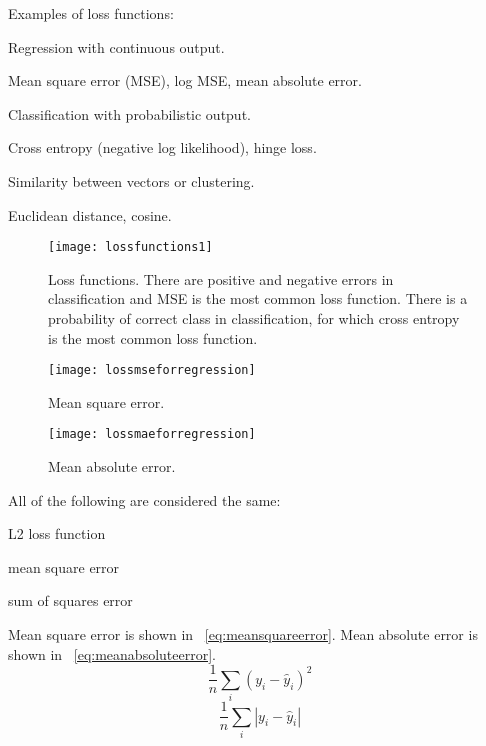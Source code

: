 Examples of loss functions:
	\begin{bulletedlist}
		\item Regression with continuous output.
		\begin{bulletedlist}
			\item Mean square error (MSE), log MSE, mean absolute error.
		\end{bulletedlist}
		\item Classification with probabilistic output.
		\begin{bulletedlist}
			\item Cross entropy (negative log likelihood), hinge loss.
		\end{bulletedlist}
		\item Similarity between vectors or clustering.
		\begin{bulletedlist}
			\item Euclidean distance, cosine.
		\end{bulletedlist}
	\end{bulletedlist}

 	\begin{figure}[htb]
		\centering
		\texttt{[image: lossfunctions1]}
		\caption[Loss functions]{Loss functions.  There are positive and negative errors in classification and MSE is the most common loss function.  There is a probability of correct class in classification, for which cross entropy is the most common loss function.}
		\label{fig:lossfunctions1}
	\end{figure}
 	\begin{figure}[htb]
		\centering
		\texttt{[image: lossmseforregression]}
		\caption[Mean square error]{Mean square error.}
		\label{fig:lossmseforregression}
	\end{figure}
 	\begin{figure}[htb]
		\centering
		\texttt{[image: lossmaeforregression]}
		\caption[Mean absolute error]{Mean absolute error.}
		\label{fig:lossmaeforregression}
	\end{figure}

All of the following are considered the same:
	\begin{bulletedlist}
		\item L2 loss function
		\item mean square error
		\item sum of squares error
	\end{bulletedlist}

Mean square error is shown in \equationname~\ref{eq:meansquareerror}.  Mean absolute error is shown in \equationname~\ref{eq:meanabsoluteerror}.
	\begin{equation}
		\frac{1}{n} \sum_i \left( y_i - \hat{y}_i \right)^2
		\label{eq:meansquareerror}
	\end{equation}
	\begin{equation}
		\frac{1}{n} \sum_i \left| y_i - \hat{y}_i \right|
		\label{eq:meanabsoluteerror}
	\end{equation}	
	\begin{mathwhere}
	\end{mathwhere}

